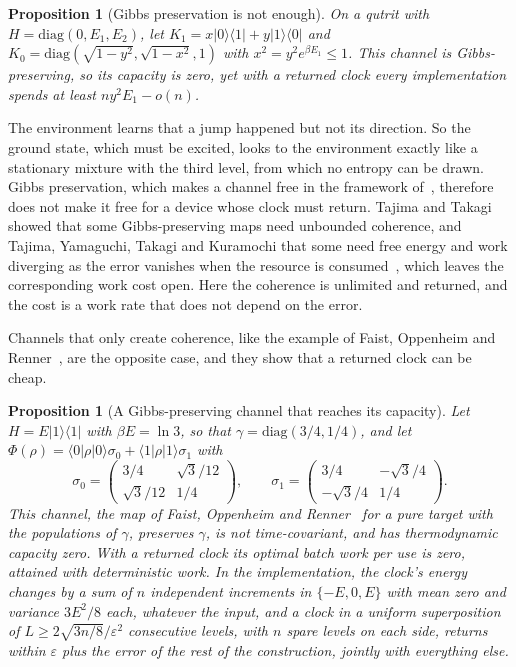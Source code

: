 \documentclass[11pt]{article}
\newtheorem{proposition}[theorem]{Proposition}
\theoremstyle{definition}
\theoremstyle{remark}
\begin{document}
\begin{proposition}[Gibbs preservation is not enough]\label{prop:gpqutrit}
On a qutrit with $H=\mathrm{diag}(0,E_1,E_2)$, let $K_1=x|0\rangle\langle1|+y|1\rangle\langle0|$ and $K_0=\mathrm{diag}(\sqrt{1-y^2},\sqrt{1-x^2},1)$ with $x^2=y^2e^{\beta E_1}\le1$. This channel is Gibbs-preserving, so its capacity is zero, yet with a returned clock every implementation spends at least $ny^2E_1-o(n)$.
\end{proposition}

The environment learns that a jump happened but not its direction. So the ground state, which must be excited, looks to the environment exactly like a stationary mixture with the third level, from which no entropy can be drawn. Gibbs preservation, which makes a channel free in the framework of~\cite{FBB21}, therefore does not make it free for a device whose clock must return. Tajima and Takagi showed that some Gibbs-preserving maps need unbounded coherence, and Tajima, Yamaguchi, Takagi and Kuramochi that some need free energy and work diverging as the error vanishes when the resource is consumed~\cite{TajimaTakagi25,TYTK25}, which leaves the corresponding work cost open. Here the coherence is unlimited and returned, and the cost is a work rate that does not depend on the error.

Channels that only create coherence, like the example of Faist, Oppenheim and Renner~\cite{FOR15}, are the opposite case, and they show that a returned clock can be cheap.

\begin{proposition}[A Gibbs-preserving channel that reaches its capacity]\label{prop:reach}
Let $H=E|1\rangle\langle1|$ with $\beta E=\ln3$, so that $\gamma=\mathrm{diag}(3/4,1/4)$, and let $\Phi(\rho)=\langle0|\rho|0\rangle\sigma_0+\langle1|\rho|1\rangle\sigma_1$ with
\[
\sigma_0=\begin{pmatrix}3/4&\sqrt3/12\\ \sqrt3/12&1/4\end{pmatrix},\qquad \sigma_1=\begin{pmatrix}3/4&-\sqrt3/4\\ -\sqrt3/4&1/4\end{pmatrix}.
\]
This channel, the map of Faist, Oppenheim and Renner~\cite{FOR15} for a pure target with the populations of $\gamma$, preserves $\gamma$, is not time-covariant, and has thermodynamic capacity zero. With a returned clock its optimal batch work per use is zero, attained with deterministic work. In the implementation, the clock's energy changes by a sum of $n$ independent increments in $\{-E,0,E\}$ with mean zero and variance $3E^2/8$ each, whatever the input, and a clock in a uniform superposition of $L\ge2\sqrt{3n/8}/\varepsilon^2$ consecutive levels, with $n$ spare levels on each side, returns within $\varepsilon$ plus the error of the rest of the construction, jointly with everything else.
\end{proposition}
\end{document}
